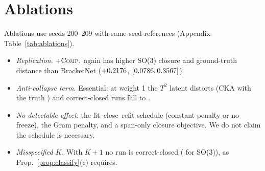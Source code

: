 \section{Ablations}\label{sec:ablations}
Ablations use seeds 200--209 with same-seed references (Appendix Table~\ref{tab:ablations}).
\begin{itemize}
\item \emph{Replication.} \textsc{+Comp.}\ again has higher SO(3) closure and ground-truth distance than BracketNet
($+0.2176$,
$[0.0786,0.3567]$).
\item \emph{Anti-collapse term.} Essential: at weight 1 the $T^2$ latent distorts (CKA with the truth
\NAbTtwoWeakanticollapseCkatruth) and correct-closed runs fall to \NAbTtwoWeakanticollapseCc.
\item \emph{No detectable effect}: the fit--close--refit schedule (constant penalty or no freeze), the Gram penalty,
and a span-only closure objective. We do not claim the schedule is necessary.
\item \emph{Misspecified $K$.} With $K{+}1$ no run is correct-closed (\NAbSOthreeKplusoneCc{} for SO(3)), as
Prop.~\ref{prop:classify}(c) requires.
\end{itemize}
